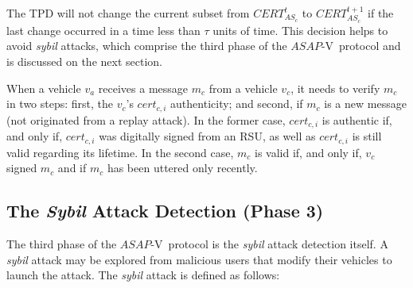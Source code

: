 \documentclass[preprint,12pt]{elsarticle}
\newcommand{\protocolname}{$ASAP$-V}
\begin{document}
The TPD will not change the current subset from $CERT^{t}_{AS_{c}}$ to $CERT^{t+1}_{AS_{c}}$ if the last change occurred in a time less than $\tau$ units of time. This decision helps to avoid \textit{sybil} attacks, which comprise the third phase of the \protocolname~protocol and is discussed on the next section.

When a vehicle $v_a$ receives a message $m_c$ from a vehicle $v_c$, it needs to verify $m_c$ in two steps: first, the $v_c$'s $cert_{c,i}$ authenticity; and second, if $m_c$ is a new message (not originated from a replay attack). In the former case,  $cert_{c,i}$ is authentic if, and only if, $cert_{c,i}$ was digitally signed from an RSU, as well as $cert_{c,i}$ is still valid regarding its lifetime. In the second case, $m_c$ is valid if, and only if, $v_c$ signed $m_c$ and if $m_c$ has been uttered only recently.


%
%
	
%

\subsection{The \textit{Sybil} Attack Detection (Phase 3)}
\label{sec:sybildetec}

The third phase of the \protocolname~protocol is the \textit{sybil} attack detection itself. A \textit{sybil} attack may be explored from malicious users that modify their vehicles to launch the attack. The \textit{sybil} attack is defined as follows:

\end{document}
